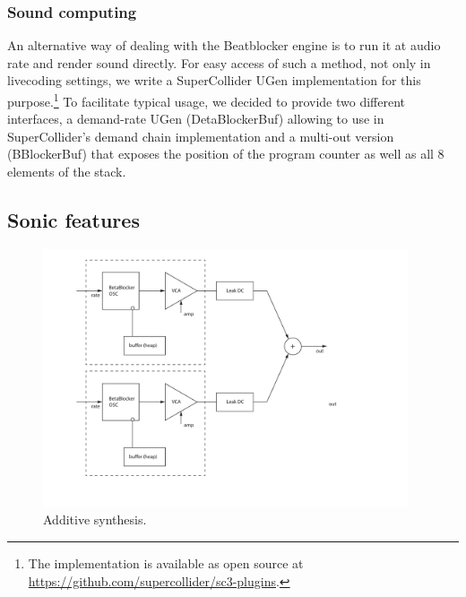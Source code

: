 \documentclass[letterpaper, 12pt]{article}
\begin{document}
\subsubsection{Sound computing} 
\label{sub:sound_computing}

An alternative way of dealing with the Beatblocker engine is to run it at audio rate and render sound directly.
For easy access of such a method, not only in livecoding settings, we write a SuperCollider UGen implementation for this purpose.\footnote{The implementation is available as open source at \url{https://github.com/supercollider/sc3-plugins}.}
To facilitate typical usage, we decided to provide two different interfaces, a demand-rate UGen (DetaBlockerBuf) allowing to use in SuperCollider's demand chain implementation 
and a multi-out version (BBlockerBuf) that exposes the position of the program counter as well as all 8 elements of the stack.




\subsection{Sonic features} 
\label{sub:sonic_features}



\begin{figure}
	\centering
		\includegraphics[height=3in]{Additive-Betablocker}
	\caption{Additive synthesis.}
	\label{fig:fig_Additive-Betablocker}
\end{figure}
\end{document}
